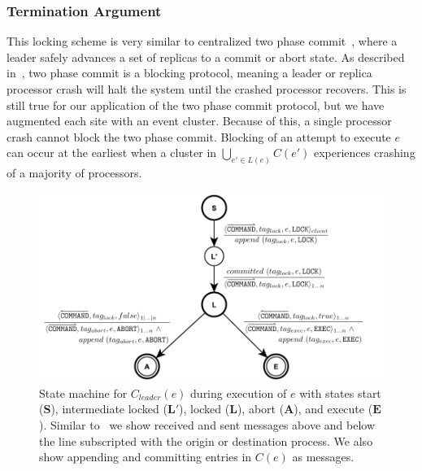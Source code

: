 \documentclass{article}
\begin{document}
	\subsubsection*{Termination Argument}

	This locking scheme is very similar to centralized two phase commit~\cite{skeen_nonblocking_1981}, where a leader safely advances a set of replicas to a commit or abort state.
	As described in~\cite{skeen_nonblocking_1981}, two phase commit is a blocking protocol, meaning a leader or replica processor crash will halt the system until the crashed processor recovers.
	This is still true for our application of the two phase commit protocol, but we have augmented each site with an event cluster.
	Because of this, a single processor crash cannot block the two phase commit.
	Blocking of an attempt to execute $e$ can occur at the earliest when a cluster in $\bigcup_{e' \in L(e)} C(e')$ experiences crashing of a majority of processors.

	\begin{figure}[ht]
  	\includegraphics[width=\textwidth]{figures/raft-2pc.pdf}
	  \caption{State machine for $C_{leader}(e)$ during execution of $e$ with states start ($\bm{S}$), intermediate locked ($\bm{L}'$), locked ($\bm{L}$), abort ($\bm{A}$), and execute ($\bm{E}$). Similar to~\cite{skeen_nonblocking_1981} we show received and sent messages above and below the line subscripted with the origin or destination process. 
	  We also show appending and committing entries in $C(e)$ as messages.}
	  \label{fig:raft-2pc}
	\end{figure}
	\FloatBarrier
\end{document}
